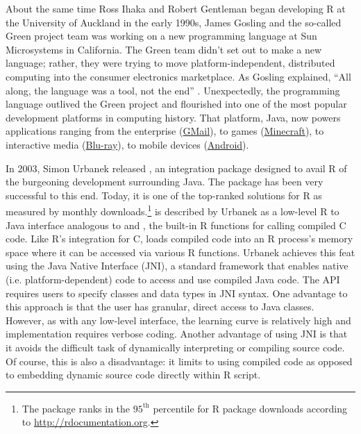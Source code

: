 About the same time Ross Ihaka and Robert Gentleman began developing R at the University of Auckland in the early 1990s, James Gosling and the so-called Green project team was working on a new programming language at Sun Microsystems in California. The Green team didn't set out to make a new language; rather, they were trying to move platform-independent, distributed computing into the consumer electronics marketplace. As Gosling explained, ``All along, the language was a tool, not the end'' \citep{javainsidestory}. Unexpectedly, the programming language outlived the Green project and flourished into one of the most popular development platforms in computing history. That platform, Java, now powers applications ranging from the enterprise (\href{https://www.google.com/gmail/about/}{GMail}), to games (\href{https://minecraft.net}{Minecraft}), to interactive media (\href{https://en.wikipedia.org/wiki/Blu-ray}{Blu-ray}), to mobile devices (\href{https://www.android.com/}{Android}).

In 2003, Simon Urbanek released , an integration package designed to avail R of the burgeoning development surrounding Java. The package has been very successful to this end. Today, it is one of the top-ranked solutions for R as measured by monthly downloads.\footnote{The  package ranks in the $95^{\text{th}}$ percentile for R package downloads according to \href{http://rdocumentation.org}{http://rdocumentation.org}.}  is described by Urbanek as a low-level R to Java interface analogous to  and , the built-in R functions for calling compiled C code. Like R's integration for C,  loads compiled code into an R process's memory space where it can be accessed via various R functions. Urbanek achieves this feat using the Java Native Interface (JNI), a standard framework that enables native (i.e. platform-dependent) code to access and use compiled Java code. The  API requires users to specify classes and data types in JNI syntax. One advantage to this approach is that the user has granular, direct access to Java classes. However, as with any low-level interface, the learning curve is relatively high and implementation requires verbose coding. Another advantage of using JNI is that it avoids the difficult task of dynamically interpreting or compiling source code. Of course, this is also a disadvantage: it limits  to using compiled code as opposed to embedding dynamic source code directly within R script.

